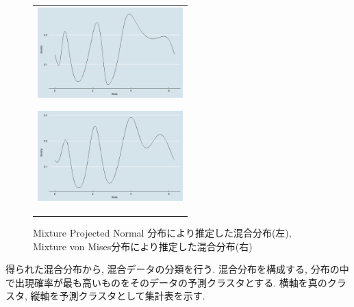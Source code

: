 \documentclass[a4paper,11pt]{jarticle}
\begin{document}
\begin{figure}[h]
 \begin{tabular}{c}
\hspace{0.5cm}
 \begin{minipage}{0.5\hsize}
  \begin{center}
   \includegraphics[clip,height= 35mm]{data/mix_pn.png}
  \end{center}
  \label{pnmix}
 \end{minipage}
\hspace{-1.0cm}
 \begin{minipage}{0.5\hsize}
  \begin{center}
   \includegraphics[clip,height= 35mm]{data/mix_von.png}
  \end{center}
  \label{vonmix}
 \end{minipage}
  \end{tabular}
\caption{Mixture Projected Normal 分布により推定した混合分布(左), Mixture von Mises分布により推定した混合分布(右)}
\end{figure}


得られた混合分布から, 混合データの分類を行う. 混合分布を構成する, 分布の中で出現確率が最も高いものをそのデータの予測クラスタとする.
横軸を真のクラスタ, 縦軸を予測クラスタとして集計表を示す. 
\end{document}
